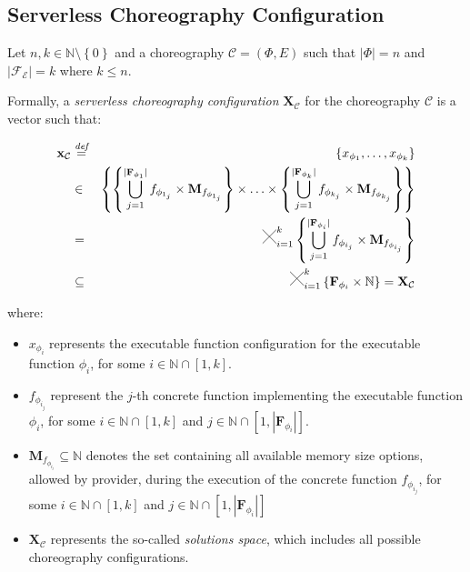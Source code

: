 \documentclass[12pt,a4paper]{report}
\newcommand{\Cross}{\mathbin{\tikz [x=2.5ex,y=2.5ex,line width=.10ex] \draw (0,0) -- (1,1) (0,1) -- (1,0);}}
\newcommand{\mathDef}{\overset{\textit{def}}{=}}
\newcommand{\N}{\mathbb{N}}
\begin{document}
\subsection{Serverless Choreography Configuration}

Let $n,k \in \N \setminus \left\lbrace 0 \right\rbrace$ and a choreography $\mathcal{C} = (\Phi,E)$ such that $|\Phi| = n$ and $|\mathscr{F_E}| = k$ where $k \leq n$.

Formally, a \textit{serverless choreography configuration} $\textbf{X}_{\mathcal{C}}$ for the choreography $\mathcal{C}$ is a vector such that:

\begin{eqnarray}
	\textbf{x}_{\mathcal{C}} & \mathDef & \left\lbrace x_{\phi_{1}}, \ldots, x_{\phi_{k}} \right\rbrace \nonumber \\ 
	& \in & \left\{  \left\{ \bigcup_{j=1}^{|\textbf{F}_{\phi_{1}}|} f_{\phi_{1_j}} \times \textbf{M}_{f_{\phi_{1_j}}} \right\} \times \ldots \times \left\{ \bigcup_{j=1}^{|\textbf{F}_{\phi_{k}}|} f_{\phi_{k_j}} \times \textbf{M}_{f_{\phi_{k_j}}} \right\} \right\}  \nonumber \\
	& = & \Cross_{i = 1}^k \left\{ \bigcup_{j=1}^{|\textbf{F}_{\phi_{i}}|} f_{\phi_{i_j}} \times \textbf{M}_{f_{\phi_{i_j}}} \right\} \nonumber \\
	& \subseteq & \Cross_{i = 1}^k \left\{ \textbf{F}_{\phi_{i}} \times \mathbb{N} \right\} = \textbf{X}_{\mathcal{C}}
\end{eqnarray}

where:

\begin{itemize}
	\item $x_{\phi_{i}}$ represents the executable function configuration for the executable function $\phi_{i}$, for some  $i \in \N \cap \left[ 1, k \right]$.
	
	\item $f_{\phi_{i_j}}$ represent the $j$-th concrete function implementing the executable function $\phi_{i}$, for some  $i \in \N \cap \left[ 1, k \right]$ and $j \in \N \cap \left[ 1, |\textbf{F}_{\phi_{i}}| \right]$.
	
	\item $\textbf{M}_{f_{\phi_{i_j}}} \subseteq \N$ denotes the set containing all available memory size options, allowed by provider, during the execution of the concrete function $f_{\phi_{i_j}}$, for some $i \in \N \cap \left[ 1, k \right]$ and $j \in \N \cap \left[ 1, |\textbf{F}_{\phi_{i}}| \right]$
	
	\item $\textbf{X}_{\mathcal{C}}$ represents the so-called \textit{solutions space}, which includes all possible choreography configurations.
\end{itemize}
\end{document}
